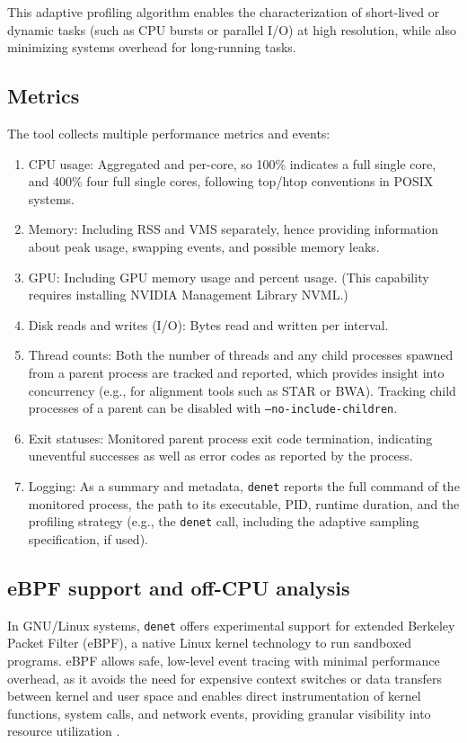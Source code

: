 \documentclass[10pt]{article}
\begin{document}
This adaptive profiling algorithm enables the characterization of short-lived or dynamic tasks (such as CPU bursts or parallel I/O) at high resolution, while also minimizing systems overhead for long-running tasks.

\subsection*{Metrics}

The tool collects multiple performance metrics and events:

\begin{enumerate}[itemsep=0.5pt, topsep=1pt]
    \item CPU usage: Aggregated and per-core, so 100\% indicates a full single core, and 400\% four full single cores, following top/htop conventions in POSIX systems.
    \item Memory: Including RSS and VMS separately, hence providing information about peak usage, swapping events, and possible memory leaks.
    \item GPU: Including GPU memory usage and percent usage. (This capability requires installing NVIDIA Management Library NVML.)
    \item Disk reads and writes (I/O): Bytes read and written per interval.
    \item Thread counts: Both the number of threads and any child processes spawned from a parent process are tracked and reported, which provides insight into concurrency (e.g., for alignment tools such as STAR or BWA). Tracking child processes of a parent can be disabled with \texttt{--no-include-children}.
    \item Exit statuses: Monitored parent process exit code termination, indicating uneventful successes as well as error codes as reported by the process.
    \item Logging: As a summary and metadata, \texttt{denet} reports the full command of the monitored process, the path to its executable, PID, runtime duration, and the profiling strategy (e.g., the \texttt{denet} call, including the adaptive sampling specification, if used).
\end{enumerate}

\subsection*{eBPF support and off-CPU analysis}

In GNU/Linux systems, \texttt{denet} offers experimental support for extended Berkeley Packet Filter (eBPF), a native Linux kernel technology to run sandboxed programs. eBPF allows safe, low-level event tracing with minimal performance overhead, as it avoids the need for expensive context switches or data transfers between kernel and user space and enables direct instrumentation of kernel functions, system calls, and network events, providing granular visibility into resource utilization \cite{gregg2019bpf,gbadamosi2024ebpf}. 
\end{document}
